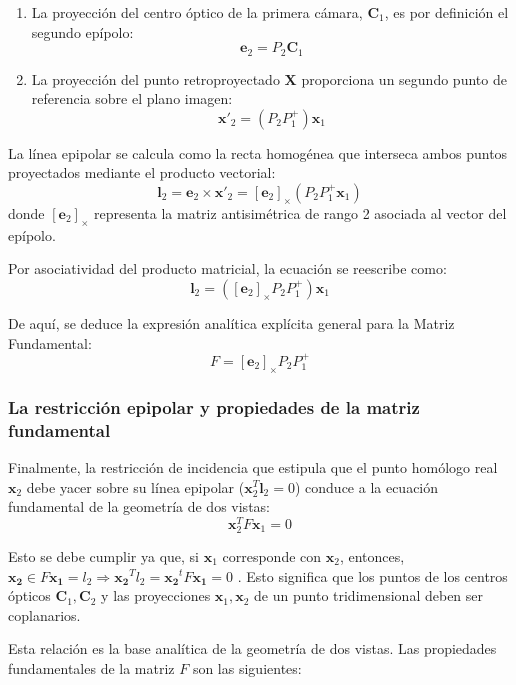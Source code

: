 \documentclass[
10pt, %
a4paper, %
oneside, %
headinclude,footinclude, %
BCOR=5mm, %
]{scrartcl}
\begin{document}
\begin{enumerate}
    \item La proyección del centro óptico de la primera cámara, $\mathbf{C}_1$, es por definición el segundo epípolo:
    \[
        \mathbf{e}_2 = P_2 \mathbf{C}_1
    \]
    \item La proyección del punto retroproyectado $\mathbf{X}$ proporciona un segundo punto de referencia sobre el plano imagen:
    \[
        \mathbf{x}'_2 = (P_2 P_1^+) \mathbf{x}_1
    \]
\end{enumerate}

La línea epipolar se calcula como la recta homogénea que interseca ambos puntos proyectados mediante el producto vectorial:
\[
    \mathbf{l}_2 = \mathbf{e}_2 \times \mathbf{x}'_2 = [\mathbf{e}_2]_\times (P_2 P_1^+ \mathbf{x}_1)
\]
donde $[\mathbf{e}_2]_\times$ representa la matriz antisimétrica de rango 2 asociada al vector del epípolo. 

Por asociatividad del producto matricial, la ecuación se reescribe como:
\[
    \mathbf{l}_2 = \left( [\mathbf{e}_2]_\times P_2 P_1^+ \right) \mathbf{x}_1
\]

De aquí, se deduce la expresión analítica explícita general para la Matriz Fundamental:
\begin{equation}
    F = [\mathbf{e}_2]_\times P_2 P_1^+
\end{equation}

\subsubsection{La restricción epipolar y propiedades de la matriz fundamental}

Finalmente, la restricción de incidencia que estipula que el punto homólogo real $\mathbf{x}_2$ debe yacer sobre su línea epipolar ($\mathbf{x}_2^T \mathbf{l}_2 = 0$) conduce a la ecuación fundamental de la geometría de dos vistas:
\begin{equation}
    \mathbf{x}_2^{T} F \mathbf{x}_1 = 0
\end{equation}

Esto se debe cumplir ya que, si $\mathbf{x}_1$ corresponde con $\mathbf{x}_2$, entonces, $\mathbf{x_2} \in F \mathbf{x_1} = l_2 \Longrightarrow  \mathbf{x_2}^T l_2 =  \mathbf{x_2}^t F  \mathbf{x_1} = 0$ . Esto significa que los puntos de los centros ópticos $\mathbf{C}_1, \mathbf{C}_2$ y las proyecciones $\mathbf{x}_1, \mathbf{x}_2$ de un punto tridimensional deben ser coplanarios.

Esta relación es la base analítica de la geometría de dos vistas. Las propiedades fundamentales de la matriz $F$ son las siguientes:
\end{document}
